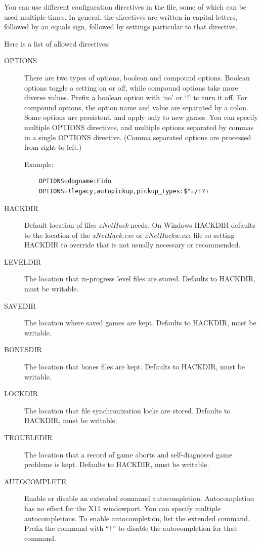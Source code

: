 \documentclass[titlepage]{article}
\begin{document}
You can use different configuration directives in the file, some
of which can be used multiple times.
In general, the directives are
written in capital letters, followed by an equals sign, followed by
settings particular to that directive.

Here is a list of allowed directives:

\begin{description}
\item[OPTIONS]
There are two types of options, boolean and compound options.
Boolean options toggle a setting on or off, while compound options
take more diverse values.
Prefix a boolean option with `no' or `!' to turn it off.
For compound options, the option name and value are separated by a colon.
Some options are persistent, and apply only to new games.
You can specify multiple OPTIONS directives, and multiple options
separated by commas in a single OPTIONS directive.
(Comma separated options are processed from right to left.)

Example:
\begin{verbatim}
    OPTIONS=dogname:Fido
    OPTIONS=!legacy,autopickup,pickup_types:$"=/!?+
\end{verbatim}

\item[HACKDIR]
Default location of files \textit{xNetHack} needs. On Windows HACKDIR
defaults to the location of the \textit{xNetHack.exe} or \textit{xNetHackw.exe} file
so setting HACKDIR to override that is not usually necessary or recommended.
\item[LEVELDIR]
The location that in-progress level files are stored. Defaults to HACKDIR,
must be writable.
\item[SAVEDIR]
The location where saved games are kept. Defaults to HACKDIR, must be
writable.
\item[BONESDIR]
The location that bones files are kept. Defaults to HACKDIR, must be
writable.
\item[LOCKDIR]
The location that file synchronization locks are stored. Defaults to
HACKDIR, must be writable.
\item[TROUBLEDIR]
The location that a record of game aborts and self-diagnosed game problems
is kept. Defaults to HACKDIR, must be writable.
%
%
\item[AUTOCOMPLETE]
Enable or disable an extended command autocompletion.
Autocompletion has no effect for the X11 windowport.
You can specify multiple autocompletions. To enable
autocompletion, list the extended command. Prefix the
command with ``\texttt{!}'' to disable the autocompletion
for that command.


\end{description}
\end{document}
